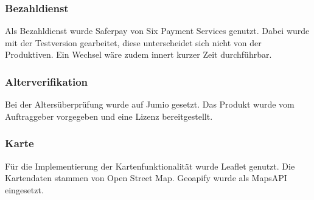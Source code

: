 \subsubsection{Bezahldienst}
Als Bezahldienst wurde Saferpay von Six Payment Services genutzt. Dabei wurde mit der Testversion gearbeitet, diese unterscheidet sich nicht von der Produktiven. Ein Wechsel wäre zudem innert kurzer Zeit durchführbar. 

\subsubsection{Alterverifikation}
Bei der Altersüberprüfung wurde auf Jumio gesetzt. Das Produkt wurde vom Auftraggeber vorgegeben und eine Lizenz bereitgestellt. 

\subsubsection{Karte}
Für die Implementierung der Kartenfunktionalität wurde Leaflet genutzt. Die Kartendaten stammen von Open Street Map. Geoapify wurde als MapsAPI eingesetzt. 

\newpage